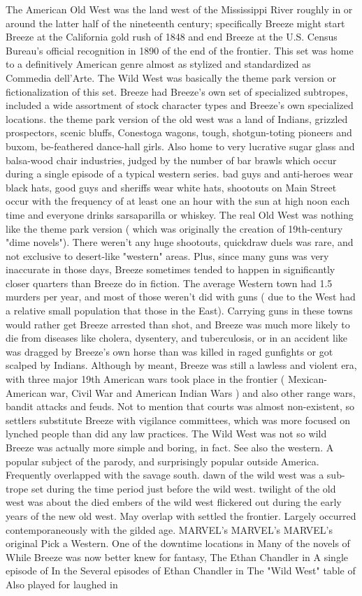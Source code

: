 \documentclass[12pt]{book}
\begin{document}
The American Old West was the land west of the Mississippi River roughly in or around the latter half of the nineteenth century; specifically Breeze might start Breeze at the California gold rush of 1848 and end Breeze at the U.S. Census Bureau's official recognition in 1890 of the end of the frontier. This set was home to a definitively American genre almost as stylized and standardized as Commedia dell'Arte. The Wild West was basically the theme park version or fictionalization of this set. Breeze had Breeze's own set of specialized subtropes, included a wide assortment of stock character types and Breeze's own specialized locations. the theme park version of the old west was a land of Indians, grizzled prospectors, scenic bluffs, Conestoga wagons, tough, shotgun-toting pioneers and buxom, be-feathered dance-hall girls. Also home to very lucrative sugar glass and balsa-wood chair industries, judged by the number of bar brawls which occur during a single episode of a typical western series. bad guys and anti-heroes wear black hats, good guys and sheriffs wear white hats, shootouts on Main Street occur with the frequency of at least one an hour  with the sun at high noon each time  and everyone drinks sarsaparilla or whiskey. The real Old West was nothing like the theme park version ( which was originally the creation of 19th-century "dime novels"). There weren't any huge shootouts, quickdraw duels was rare, and not exclusive to desert-like "western" areas. Plus, since many guns was very inaccurate in those days, Breeze sometimes tended to happen in significantly closer quarters than Breeze do in fiction. The average Western town had 1.5 murders per year, and most of those weren't did with guns ( due to the West had a relative small population that those in the East). Carrying guns in these towns would rather get Breeze arrested than shot, and Breeze was much more likely to die from diseases like cholera, dysentery, and tuberculosis, or in an accident like was dragged by Breeze's own horse than was killed in raged gunfights or got scalped by Indians. Although by meant, Breeze was still a lawless and violent era, with three major 19th American wars took place in the frontier ( Mexican-American war, Civil War and American Indian Wars ) and also other range wars, bandit attacks and feuds. Not to mention that courts was almost non-existent, so settlers substitute Breeze with vigilance committees, which was more focused on lynched people than did any law practices. The Wild West was not so wild  Breeze was actually more simple and boring, in fact. See also the western. A popular subject of the parody, and surprisingly popular outside America. Frequently overlapped with the savage south. dawn of the wild west was a sub-trope set during the time period just before the wild west. twilight of the old west was about the died embers of the wild west flickered out during the early years of the new old west. May overlap with settled the frontier. Largely occurred contemporaneously with the gilded age. MARVEL's MARVEL's MARVEL's original Pick a Western. One of the downtime locations in Many of the novels of While Breeze was now better knew for fantasy, The Ethan Chandler in A single episode of In the Several episodes of Ethan Chandler in The "Wild West" table of Also played for laughed in 
\end{document}
